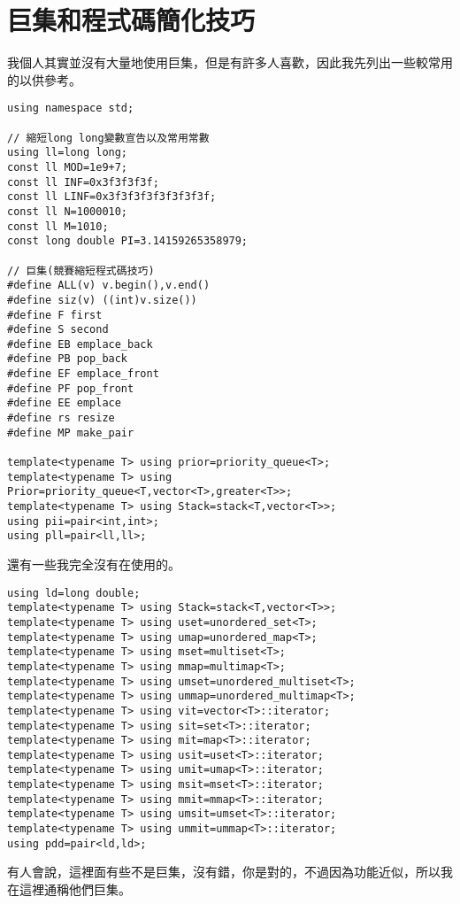 \section{巨集和程式碼簡化技巧}
    我個人其實並沒有大量地使用巨集，但是有許多人喜歡，因此我先列出一些較常用的以供參考。

    \begin{lstlisting}[caption=巨集們]
using namespace std;

// 縮短long long變數宣告以及常用常數
using ll=long long;
const ll MOD=1e9+7;
const ll INF=0x3f3f3f3f;
const ll LINF=0x3f3f3f3f3f3f3f3f;
const ll N=1000010;
const ll M=1010;
const long double PI=3.14159265358979;

// 巨集(競賽縮短程式碼技巧)
#define ALL(v) v.begin(),v.end()
#define siz(v) ((int)v.size())
#define F first
#define S second
#define EB emplace_back
#define PB pop_back
#define EF emplace_front
#define PF pop_front
#define EE emplace
#define rs resize
#define MP make_pair

template<typename T> using prior=priority_queue<T>;
template<typename T> using Prior=priority_queue<T,vector<T>,greater<T>>;
template<typename T> using Stack=stack<T,vector<T>>;
using pii=pair<int,int>;
using pll=pair<ll,ll>;\end{lstlisting}

    還有一些我完全沒有在使用的。

    \begin{lstlisting}[caption=更多巨集們]
using ld=long double;
template<typename T> using Stack=stack<T,vector<T>>;
template<typename T> using uset=unordered_set<T>;
template<typename T> using umap=unordered_map<T>;
template<typename T> using mset=multiset<T>;
template<typename T> using mmap=multimap<T>;
template<typename T> using umset=unordered_multiset<T>;
template<typename T> using ummap=unordered_multimap<T>;
template<typename T> using vit=vector<T>::iterator;
template<typename T> using sit=set<T>::iterator;
template<typename T> using mit=map<T>::iterator;
template<typename T> using usit=uset<T>::iterator;
template<typename T> using umit=umap<T>::iterator;
template<typename T> using msit=mset<T>::iterator;
template<typename T> using mmit=mmap<T>::iterator;
template<typename T> using umsit=umset<T>::iterator;
template<typename T> using ummit=ummap<T>::iterator;
using pdd=pair<ld,ld>;\end{lstlisting}

    \begin{tip}
        有人會說，這裡面有些不是巨集，沒有錯，你是對的，不過因為功能近似，所以我在這裡通稱他們巨集。
    \end{tip}